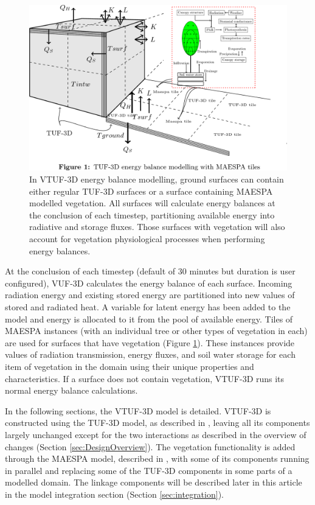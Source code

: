 \documentclass[final,3p,times,authoryear]{elsarticle}
\begin{document}
\begin{figure}[!htbp]
 \includegraphics[trim = 0mm 14mm 22mm 0.0mm, clip, scale=0.25]{images/TUFWithMaespaInsert.png}
 \caption{\label{fig:TUFWithMaespaInsert} In VTUF-3D energy balance modelling, ground surfaces can contain either regular TUF-3D surfaces or a surface containing MAESPA modelled vegetation. All surfaces will calculate energy balances at the conclusion of each timestep, partitioning available energy into radiative and storage fluxes. Those surfaces with vegetation will also account for vegetation physiological processes when performing energy balances.}
\end{figure}

At the conclusion of each timestep (default of 30 minutes but duration is user configured), VUF-3D calculates the energy balance of each surface. Incoming radiation energy and existing stored energy are partitioned into new values of stored and radiated heat. A variable for latent energy has been added to the model and energy is allocated to it from the pool of available energy. Tiles of MAESPA instances (with an individual tree or other types of vegetation in each) are used for surfaces that have vegetation (Figure \ref{fig:TUFWithMaespaInsert}). These instances provide values of radiation transmission, energy fluxes, and soil water storage for each item of vegetation in the domain using their unique properties and characteristics. If a surface does not contain vegetation, VTUF-3D runs its normal energy balance calculations.


In the following sections, the VTUF-3D model is detailed. VTUF-3D is constructed using the TUF-3D model, as described in \cite{Krayenhoff2007}, leaving all its components largely unchanged except for the two interactions as described in the overview of changes (Section \ref{sec:DesignOverview}). The vegetation functionality is added through the MAESPA model, described in \cite{Duursma2012}, with some of its components running in parallel and replacing some of the TUF-3D components in some parts of a modelled domain. The linkage components will be described later in this article in the model integration section (Section \ref{sec:integration}).
\end{document}
